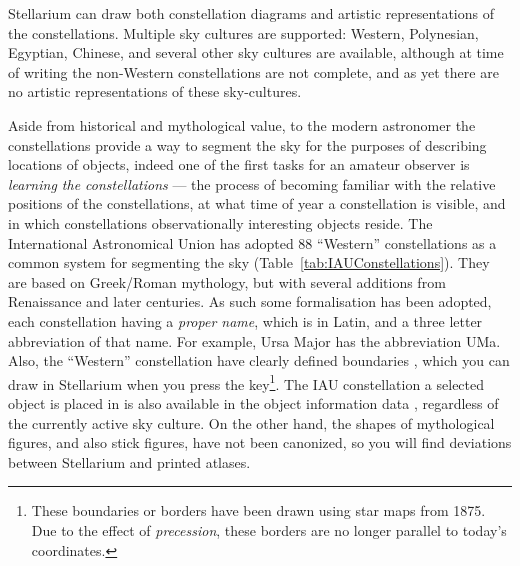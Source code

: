 Stellarium can draw both constellation diagrams and artistic
representations of the constellations. Multiple sky cultures are
supported: Western, Polynesian, Egyptian, Chinese, and several other sky cultures are
available, although at time of writing the non-Western constellations
are not complete, and as yet there are no artistic representations of
these sky-cultures.

Aside from historical and mythological value, to the modern astronomer
the constellations provide a way to segment the sky for the purposes
of describing locations of objects, indeed one of the first tasks for
an amateur observer is \emph{learning the constellations} --- the
process of becoming familiar with the relative positions of the
constellations, at what time of year a constellation is visible, and
in which constellations observationally interesting objects reside.
The International Astronomical Union has adopted 88 ``Western''
constellations as a common system for segmenting the sky (Table~\ref{tab:IAUConstellations}). They are
based on Greek/Roman mythology, but with several additions from
Renaissance and later centuries.  As such some formalisation has been
adopted, each constellation having a \emph{proper name}, which is in
Latin, and a three letter abbreviation of that name.  For example,
Ursa Major has the abbreviation UMa. Also, the ``Western''
constellation have clearly defined boundaries \citep{Delporte:1930}, which you can draw in
Stellarium when you press the  key\footnote{These boundaries or
  borders have been drawn using star maps from 1875. Due to the effect
  of \emph{precession}, these borders are no longer parallel to
  today's coordinates.}. The IAU constellation a selected object is placed in 
is also available in the object information data \citep{1987PASP...99..695R}, 
regardless of the currently active sky culture.  On the other hand, the shapes 
of mythological figures, and also stick figures, have not been canonized, so 
you will find deviations between Stellarium and printed atlases.


